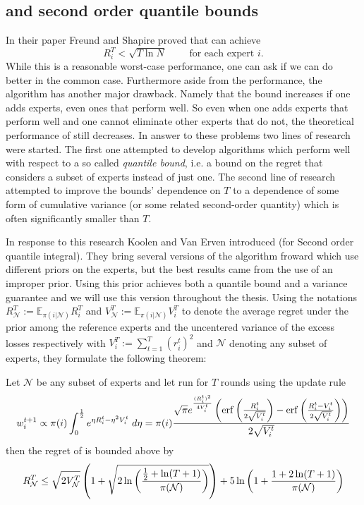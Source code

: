 \subsection{\squint and second order quantile bounds}
\label{subsec:squint}
In their paper \cite{Freund1997} Freund and Shapire proved  that \hedge can achieve $$R^T_i < \sqrt{T \ln N}\qquad \text{ for each expert } i.$$ While this is a reasonable worst-case performance, one can ask if we can do better in the common case. Furthermore aside from the performance, the algorithm has another major drawback. Namely that the bound increases if one adds experts, even ones that perform well. So even when one adds experts that perform well and one cannot eliminate other experts that do not, the theoretical performance of \hedge still decreases. 
In answer to these problems two lines of research were started. The first one attempted to develop algorithms which perform well with respect to a so called \textit{quantile bound}, i.e. a bound on the regret that considers a subset of experts instead of just one. The second line of research attempted to improve the bounds' dependence on $T$ to a dependence of some form of cumulative variance (or some related second-order quantity) which is often significantly smaller than $T$. 

\par In response to this research Koolen and Van Erven introduced \squint\cite{Koolen2015} (for Second order quantile integral). They bring several versions of the algorithm froward which use different priors on the experts, but the best results came from the use of an improper prior. Using this prior \squint achieves both a quantile bound and a variance guarantee and we will use this version throughout the thesis.
Using the notations $R^T_\mathcal{N} := \mathbb{E}_{\pi(i|\mathcal N)}R^T_i$ and  $V^T_\mathcal{N} := \mathbb{E}_{\pi(i|\mathcal N)}V^T_i$ to denote the average regret under the prior among the reference experts and the uncentered variance of the excess losses respectively with $V^T_i := \sum^T_{t=1}(r^t_i)^2$ and $\mathcal N$ denoting any subset of experts, they formulate the following theorem:

 \begin{theorem}\label{Thm:SquintPerf}\cite{Koolen2015}
 Let $\mathcal{N}$ be any subset of experts and let \squint run for $T$ rounds using the update rule
  $$w^{t+1}_i \propto \pi(i)\int_0^{\frac12}e^{\eta R^t_i-\eta^2V_i^t} \;d\eta=\pi(i) \frac{\sqrt{\pi}e^{\frac{(R^t_i)^2}{4V^t_i}}\left(\operatorname{erf}\left(\frac{R^t_i}{2\sqrt{V_i^t}}\right)-\operatorname{erf}\left(\frac{R_i^t-V_i^t}{2\sqrt{V_i^t}}\right)\right)}{2\sqrt{V_i^t}}$$
  then the regret of \squint is bounded above by
  $$R^T_\mathcal{N}\leq \sqrt{2V^T_\mathcal N}\left(1+\sqrt{2\ln\left(\frac{\frac12+\ln(T+1)}{\pi(\mathcal{N})}\right)}\right)+5\ln\left(1+\frac{1+2\ln(T+1)}{\pi(\mathcal N)}\right)$$

 \end{theorem}

